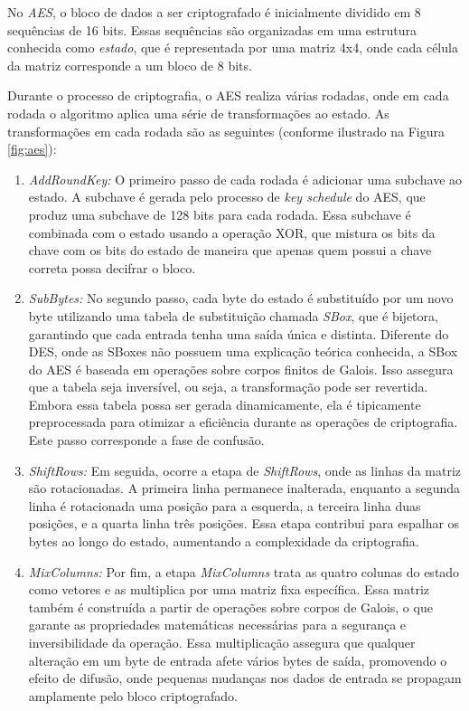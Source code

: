 No \textit{AES}, o bloco de dados a ser criptografado é inicialmente dividido em 8 sequências de 16 bits. Essas sequências são organizadas em uma estrutura conhecida como \textit{estado}, que é representada por uma matriz 4x4, onde cada célula da matriz corresponde a um bloco de 8 bits.

Durante o processo de criptografia, o AES realiza várias rodadas, onde em cada rodada o algoritmo aplica uma série de transformações ao estado.
As transformações em cada rodada são as seguintes (conforme ilustrado na Figura \ref{fig:aes}):

\begin{enumerate}
\item {\em AddRoundKey:}
  O primeiro passo de cada rodada é adicionar uma subchave ao estado.
  A subchave é gerada pelo processo de \textit{key schedule} do AES, que produz uma subchave de 128 bits para cada rodada.
  Essa subchave é combinada com o estado usando a operação XOR, que mistura os bits da chave com os bits do estado de maneira que apenas quem possui a chave correta possa decifrar o bloco.

\item {\em SubBytes:}
  No segundo passo, cada byte do estado é substituído por um novo byte utilizando uma tabela de substituição chamada {\em SBox}, que é bijetora, garantindo que cada entrada tenha uma saída única e distinta.
  Diferente do DES, onde as SBoxes não possuem uma explicação teórica conhecida, a SBox do AES é baseada em operações sobre corpos finitos de Galois.
  Isso assegura que a tabela seja inversível, ou seja, a transformação pode ser revertida.
  Embora essa tabela possa ser gerada dinamicamente, ela é tipicamente preprocessada para otimizar a eficiência durante as operações de criptografia.
  Este passo corresponde a fase de confusão.
  
\item {\em ShiftRows:}
  Em seguida, ocorre a etapa de \textit{ShiftRows}, onde as linhas da matriz são rotacionadas.
  A primeira linha permanece inalterada, enquanto a segunda linha é rotacionada uma posição para a esquerda, a terceira linha duas posições, e a quarta linha três posições.
  Essa etapa contribui para espalhar os bytes ao longo do estado, aumentando a complexidade da criptografia.

\item {\em MixColumns:}
  Por fim, a etapa {\em MixColumns} trata as quatro colunas do estado como vetores e as multiplica por uma matriz fixa específica.
  Essa matriz também é construída a partir de operações sobre corpos de Galois, o que garante as propriedades matemáticas necessárias para a segurança e inversibilidade da operação.
  Essa multiplicação assegura que qualquer alteração em um byte de entrada afete vários bytes de saída, promovendo o efeito de difusão, onde pequenas mudanças nos dados de entrada se propagam amplamente pelo bloco criptografado.
  
\end{enumerate}

